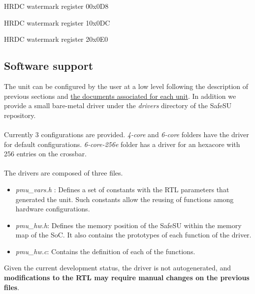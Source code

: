 \begin{register}{H}{RDC watermark register 0}{0x0D8}
	\label{RDC_water0}
	\regnewline
\end{register}


\begin{register}{H}{RDC watermark register 1}{0x0DC}
	\label{RDC_water1}
	\regnewline
\end{register}

\begin{register}{H}{RDC watermark register 2}{0x0E0}
	\label{RDC_water2}
	\regnewline
\end{register}


\subsection{Software support}
The unit can be configured by the user at a low level following the description of previous sections and \href{https://gitlab.bsc.es/caos_hw/hdl_ip/bsc_pmu/-/tree/develop/docs}{the documents associated for each unit}. In addition we provide a small bare-metal driver under the \textit{drivers} directory of the SafeSU repository.\\
\\
Currently 3 configurations are provided. \textit{4-core} and \textit{6-core} folders have the driver for default configurations. \textit{6-core-256e} folder has a driver for an hexacore with 256 entries on the crossbar.\\
\\
The drivers are composed of three files.
\begin{itemize}
\item \textit{pmu\_vars.h }: Defines a set of constants with the RTL parameters that generated the unit. Such constants allow the reusing of functions among hardware configurations.
\item\textit{ pmu\_hw.h}: Defines the memory position of the SafeSU within the memory map of the SoC. It also contains the prototypes of each function of the driver.
\item \textit{pmu\_hw.c}: Contains the definition of each of the functions.
\end{itemize}
Given the current development status, the driver is not autogenerated, and \textbf{modifications to the RTL may require manual changes on the previous files}.

